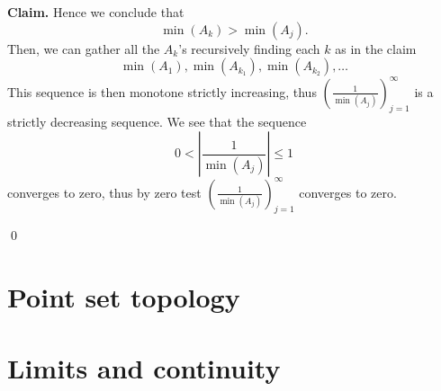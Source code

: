 \documentclass{article}
\theoremstyle{remark}
\newenvironment{claim}{\textbf{Claim.}}{}
\begin{document}
\begin{enumerate}
\begin{claim}
    Hence we conclude that
    \[
    \min(A_k) > \min(A_j).
    \]
    \end{claim}
    Then, we can gather all the $A_k$'s recursively finding each $k$ as in the claim
    \[
    \min(A_1), \min(A_{k_1}), \min(A_{k_2}), \dots  
    \]
    This sequence is then monotone strictly increasing, thus 
    \(\left(\frac{1}{\min(A_j)}\right)_{j=1}^{\infty}\) is a strictly decreasing sequence.
    We see that the sequence
    \[
    0 < \left\lvert \frac{1}{\min(A_j)} \right\rvert \leq 1
    \]
    converges to zero, thus by zero test \(\left(\frac{1}{\min(A_j)}\right)_{j=1}^{\infty}\) converges to zero.
    \begin{flushright}
        \qed
    \end{flushright}
\end{enumerate}
\section*{Point set topology}

\section*{Limits and continuity}
\end{document}
